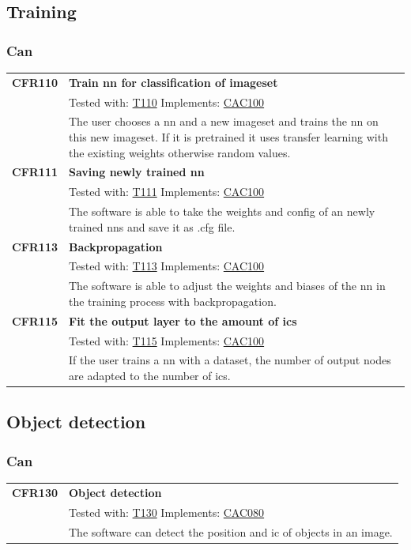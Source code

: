 \documentclass[parskip=full]{scrartcl}
\begin{document}
\subsection{Training}
\subsubsection{Can}
\begin{tabular}{p{2cm}p{11.4cm}}
\textbf{CFR110} \hypertarget{CFR110} & \textbf{Train \gls{nn} for classification of imageset}\\
& Tested with: \hyperlink{T110}{T110} Implements: \hyperlink{CAC100}{CAC100} \\
& The user chooses a \gls{nn} and a new imageset and trains the \gls{nn} on this new imageset. If it is pretrained it uses transfer learning with the existing weights otherwise random values.\\
\textbf {CFR111} \hypertarget{CFR111} & \textbf{Saving newly trained \gls{nn}} \\
& Tested with: \hyperlink{T111}{T111} Implements: \hyperlink{CAC100}{CAC100} \\
& The software is able to take the weights and config of an newly trained \glspl{nn} and save it as .cfg file. \\
\textbf {CFR113} \hypertarget{CFR113} & \textbf{Backpropagation} \\
& Tested with: \hyperlink{T113}{T113} Implements: \hyperlink{CAC100}{CAC100} \\
& The software is able to adjust the weights and biases of the \gls{nn} in the training process with backpropagation.\\
\textbf{CFR115} \hypertarget{CFR115} & \textbf{Fit the output layer to the amount of \glspl{ic}}\\
& Tested with: \hyperlink{T115}{T115} Implements: \hyperlink{CAC100}{CAC100} \\
& If the user trains a \gls{nn} with a dataset, the number of output nodes are adapted to the number of \glspl{ic}.\\
\end{tabular}

\subsection{Object detection}
\subsubsection{Can}
\begin{tabular}{p{2cm}p{11.4cm}}
\textbf {CFR130} \hypertarget{CFR130} & \textbf{Object detection} \\
& Tested with: \hyperlink{T130}{T130} Implements: \hyperlink{CAC080}{CAC080} \\
& The software can detect the position and \gls{ic} of objects in an image.\\

\end{tabular}
\end{document}
